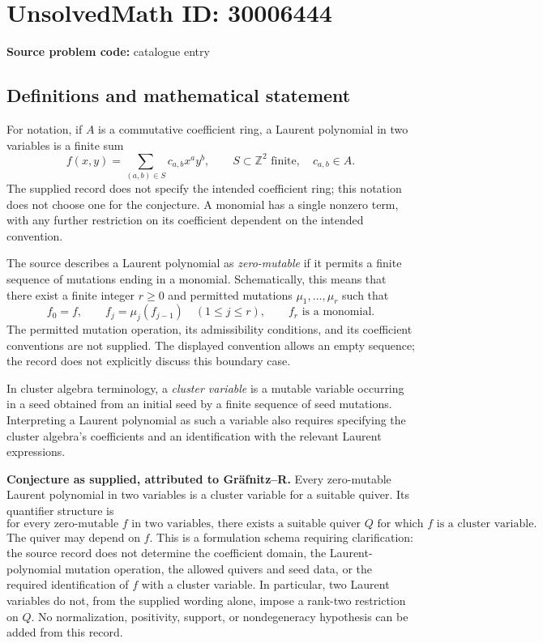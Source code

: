 \documentclass[11pt]{article}
\newcommand{\Z}{\mathbb{Z}}
\begin{document}
\section*{UnsolvedMath ID: 30006444}
\textbf{Source problem code:} catalogue entry
\subsection{Definitions and mathematical statement}
For notation, if \(A\) is a commutative coefficient ring, a Laurent polynomial in two variables is a finite sum
\[
 f(x,y)=\sum_{(a,b)\in S}c_{a,b}x^a y^b,
 \qquad S\subset\Z^2\text{ finite},\quad c_{a,b}\in A.
\]
The supplied record does not specify the intended coefficient ring; this notation does not choose one for the conjecture. A monomial has a single nonzero term, with any further restriction on its coefficient dependent on the intended convention.

The source describes a Laurent polynomial as \emph{zero-mutable} if it permits a finite sequence of mutations ending in a monomial. Schematically, this means that there exist a finite integer \(r\geq 0\) and permitted mutations \(\mu_1,\ldots,\mu_r\) such that
\[
 f_0=f,\qquad f_j=\mu_j(f_{j-1})\quad(1\leq j\leq r),
 \qquad f_r\text{ is a monomial}.
\]
The permitted mutation operation, its admissibility conditions, and its coefficient conventions are not supplied. The displayed convention allows an empty sequence; the record does not explicitly discuss this boundary case.

In cluster algebra terminology, a \emph{cluster variable} is a mutable variable occurring in a seed obtained from an initial seed by a finite sequence of seed mutations. Interpreting a Laurent polynomial as such a variable also requires specifying the cluster algebra's coefficients and an identification with the relevant Laurent expressions.

\textbf{Conjecture as supplied, attributed to Gr\"afnitz--R.} Every zero-mutable Laurent polynomial in two variables is a cluster variable for a suitable quiver. Its quantifier structure is
\[
 \text{for every zero-mutable }f\text{ in two variables, there exists a suitable quiver }Q
 \text{ for which }f\text{ is a cluster variable}.
\]
The quiver may depend on \(f\). This is a formulation schema requiring clarification: the source record does not determine the coefficient domain, the Laurent-polynomial mutation operation, the allowed quivers and seed data, or the required identification of \(f\) with a cluster variable. In particular, two Laurent variables do not, from the supplied wording alone, impose a rank-two restriction on \(Q\). No normalization, positivity, support, or nondegeneracy hypothesis can be added from this record.
\end{document}
